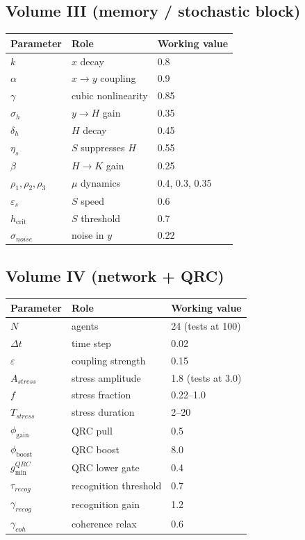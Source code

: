 \subsection*{Volume III (memory / stochastic block)}
\begin{tabular}{lll}
\toprule
Parameter & Role & Working value \\
\midrule
$k$ & $x$ decay & 0.8 \\
$\alpha$ & $x\to y$ coupling & 0.9 \\
$\gamma$ & cubic nonlinearity & 0.85 \\
$\sigma_h$ & $y\to H$ gain & 0.35 \\
$\delta_h$ & $H$ decay & 0.45 \\
$\eta_s$ & $S$ suppresses $H$ & 0.55 \\
$\beta$ & $H\to K$ gain & 0.25 \\
$\rho_1,\rho_2,\rho_3$ & $\mu$ dynamics & 0.4, 0.3, 0.35 \\
$\varepsilon_s$ & $S$ speed & 0.6 \\
$h_{\mathrm{crit}}$ & $S$ threshold & 0.7 \\
$\sigma_{noise}$ & noise in $y$ & 0.22 \\
\bottomrule
\end{tabular}

\subsection*{Volume IV (network + QRC)}
\begin{tabular}{lll}
\toprule
Parameter & Role & Working value \\
\midrule
$N$ & agents & 24 (tests at 100) \\
$\Delta t$ & time step & 0.02 \\
$\varepsilon$ & coupling strength & 0.15 \\
$A_{stress}$ & stress amplitude & 1.8 (tests at 3.0) \\
$f$ & stress fraction & 0.22--1.0 \\
$T_{stress}$ & stress duration & 2--20 \\
$\phi_{\mathrm{gain}}$ & QRC pull & 0.5 \\
$\phi_{\mathrm{boost}}$ & QRC boost & 8.0 \\
$g_{\min}^{QRC}$ & QRC lower gate & 0.4 \\
$\tau_{recog}$ & recognition threshold & 0.7 \\
$\gamma_{recog}$ & recognition gain & 1.2 \\
$\gamma_{coh}$ & coherence relax & 0.6 \\
\bottomrule
\end{tabular}

